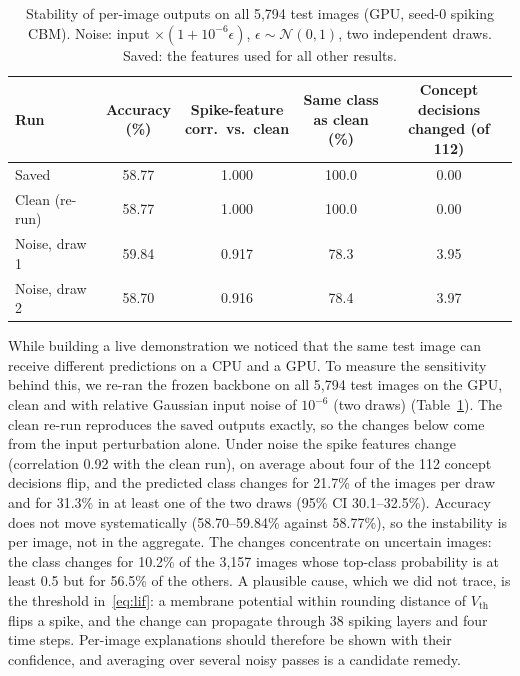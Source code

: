 \documentclass[conference]{IEEEtran}
\begin{document}
\begin{table}[t]
\caption{Stability of per-image outputs on all 5,794 test images (GPU, seed-0 spiking CBM). Noise: input $\times(1+10^{-6}\epsilon)$, $\epsilon\sim\mathcal{N}(0,1)$, two independent draws. Saved: the features used for all other results.}
\label{tab:stab}
\centering
\footnotesize
\setlength{\tabcolsep}{3pt}
\begin{tabular}{@{}lcccc@{}}
\toprule
Run & \makecell{Accuracy\\(\%)} & \makecell{Spike-feature\\corr.\ vs.\ clean} & \makecell{Same class\\as clean (\%)} & \makecell{Concept decisions\\changed (of 112)} \\
\midrule
Saved & 58.77 & 1.000 & 100.0 & 0.00 \\
Clean (re-run) & 58.77 & 1.000 & 100.0 & 0.00 \\
Noise, draw 1 & 59.84 & 0.917 & 78.3 & 3.95 \\
Noise, draw 2 & 58.70 & 0.916 & 78.4 & 3.97 \\
\bottomrule
\end{tabular}
\end{table}

While building a live demonstration we noticed that the same test image can receive different predictions on a CPU and a GPU. To measure the sensitivity behind this, we re-ran the frozen backbone on all 5,794 test images on the GPU, clean and with relative Gaussian input noise of $10^{-6}$ (two draws) (Table~\ref{tab:stab}). The clean re-run reproduces the saved outputs exactly, so the changes below come from the input perturbation alone. Under noise the spike features change (correlation 0.92 with the clean run), on average about four of the 112 concept decisions flip, and the predicted class changes for 21.7\% of the images per draw and for 31.3\% in at least one of the two draws (95\% CI 30.1--32.5\%). Accuracy does not move systematically (58.70--59.84\% against 58.77\%), so the instability is per image, not in the aggregate. The changes concentrate on uncertain images: the class changes for 10.2\% of the 3,157 images whose top-class probability is at least 0.5 but for 56.5\% of the others. A plausible cause, which we did not trace, is the threshold in~\eqref{eq:lif}: a membrane potential within rounding distance of $V_{\mathrm{th}}$ flips a spike, and the change can propagate through 38 spiking layers and four time steps. Per-image explanations should therefore be shown with their confidence, and averaging over several noisy passes is a candidate remedy.
\end{document}
